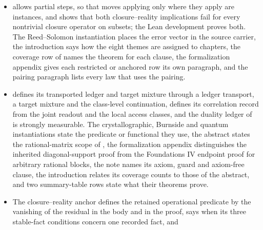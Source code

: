 \begin{itemize}
  equivalent to every fiber probability being a point mass, and its
  concentration clause is proved from additivity alone; 
  characterizes the stable limit quotient for every index;
   characterizes minimal domains under strict factorization;
   states when the parent carries exactly the children's
  distinctions; and  shows that each of its four conditions is
  independent of the others. The Lean development proves these clauses. The
  catalog boundary, horizon-bounded support, record formation and diagnosis
  source data are defined by formulas,  assumes only that the
  traces have infimum zero, and the quantum instantiation of
   places decoherence in the dissolution obstruction.
\item {} allows partial steps, so that moves applying only where
  they apply are instances, and  shows that both
  closure--reality implications fail for every nontrivial closure operator on
  subsets; the Lean development proves both. The Reed--Solomon instantiation
  places the error vector in the source carrier, the introduction says how the
  eight themes are assigned to chapters, the coverage row of  names
  the theorem for each clause, the formalization appendix gives each restricted
  or anchored row its own paragraph, and the pairing paragraph lists every law
  that uses the pairing.
\item {} defines its transported ledger and target mixture
  through a ledger transport, a target mixture and the class-level
  continuation,  defines its correlation record from the joint
  readout and the local access classes, and the duality ledger of
   is strongly measurable. The crystallographic, Burnside and
  quantum instantiations state the predicate or functional they use, the
  abstract states the rational-matrix scope of , the formalization
  appendix distinguishes the inherited diagonal-support proof from the
  Foundations IV endpoint proof for arbitrary rational blocks, the  note names its
  axiom, guard and axiom-free clause, the introduction relates its coverage
  counts to those of the abstract, and two summary-table rows state what their
  theorems prove.
\item The closure--reality anchor defines the retained operational predicate by the vanishing
  of the residual in the body and in the proof,  says when its
  three stable-fact conditions concern one recorded fact, and

\end{itemize}
